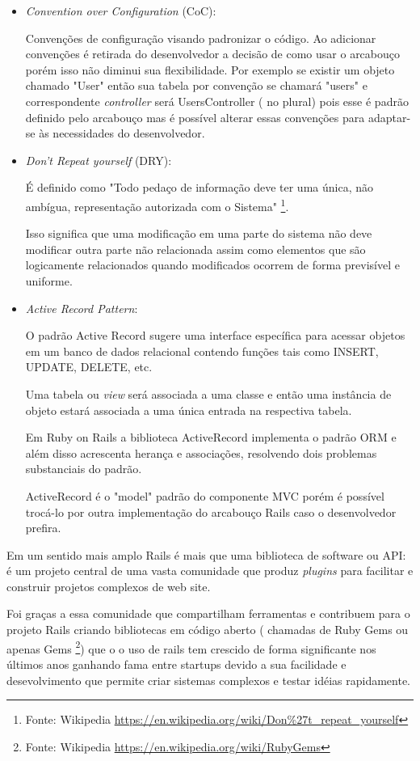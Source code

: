\begin{itemize}
\item {\emph{Convention over Configuration} (CoC):}
    \par Convenções de configuração visando padronizar o código. Ao adicionar convenções é retirada do desenvolvedor a decisão de como usar o arcabouço porém isso não diminui sua flexibilidade. Por exemplo se existir um objeto chamado "User" então sua tabela por convenção se chamará "users" e correspondente \emph{controller} será UsersController ( no plural) pois esse é padrão definido pelo arcabouço mas é possível alterar essas convenções para adaptar-se às necessidades do desenvolvedor.

\item {\emph{Don't Repeat yourself} (DRY):}
    \par É definido como "Todo pedaço de informação deve ter uma única, não ambígua, representação autorizada com o Sistema" \footnote{Fonte: Wikipedia \url{https://en.wikipedia.org/wiki/Don\%27t_repeat_yourself}}.
    \par Isso significa que uma modificação em uma parte do sistema não deve modificar outra parte não relacionada assim como elementos que são logicamente relacionados quando modificados ocorrem de forma previsível e uniforme.

\item { \emph{Active Record Pattern}:}
    \par O padrão Active Record sugere uma interface específica para acessar objetos em um banco de dados relacional contendo funções tais como INSERT, UPDATE, DELETE, etc.
    \par Uma tabela ou \emph{view} será associada a uma classe e então uma instância de objeto estará associada a uma única entrada na respectiva tabela.
    \par Em Ruby on Rails a biblioteca ActiveRecord implementa o padrão ORM e além disso acrescenta herança e associações, resolvendo dois problemas substanciais do padrão.
    \par ActiveRecord é o "model" padrão do componente MVC porém é possível trocá-lo por outra implementação do arcabouço Rails caso o desenvolvedor prefira.
\end{itemize}
    \par Em um sentido mais amplo Rails é mais que uma biblioteca de software ou API: é um projeto central de uma vasta comunidade que produz \emph{plugins} para facilitar e construir projetos complexos de web site.
    \par Foi graças a essa comunidade que compartilham ferramentas e contribuem para o projeto Rails criando bibliotecas em código aberto ( chamadas de Ruby Gems ou apenas Gems \footnote{Fonte: Wikipedia \url{https://en.wikipedia.org/wiki/RubyGems}}) que o o uso de rails tem crescido de forma significante nos últimos anos ganhando fama entre startups devido a sua  facilidade e desevolvimento que permite criar sistemas complexos e testar idéias rapidamente.

